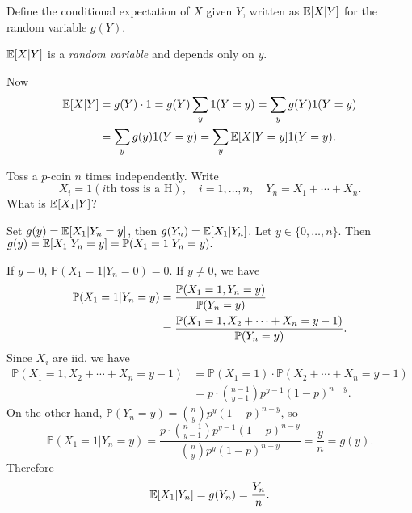 \begin{definition}
    Define the conditional expectation of $X$ given $Y$, written as $ {\mathbb{E}}[X|Y] $ for the random variable $g(Y)$.
\end{definition}
\begin{remark}
    $ {\mathbb{E}}[X|Y] $ is a \textit{random variable} and depends only on $y$.
\end{remark}
Now 
\begin{align*}
    {\mathbb{E}}[X|Y] &= g(Y)\cdot 1 = g(Y) \sum_{y} 1(Y=y) = \sum_{y} g(Y)1(Y=y)\\ 
    &= \sum_{y} g(y)1(Y=y)=\sum_{y} {\mathbb{E}}[X|Y=y]1(Y=y).
\end{align*}
\begin{example}\label{eg:2.11}
    Toss a $p$-coin $n$ times independently. Write 
    \[
        X_i = 1(i\text{th toss is a H}),\quad i=1,\dots,n,\quad Y_n=X_1+\cdots+X_n.
    \]
    What is $ {\mathbb{E}}[X_1|Y] $?

    Set $ g(y)={\mathbb{E}}[X_1|Y_n=y] $, then $g(Y_n)={\mathbb{E}}[X_1|Y_n]$. Let $ y\in \{0,\dots,n\} $. Then $g(y) = {\mathbb{E}}[X_1|Y_n=y] = \mathbb{P}(X_1=1|Y_n=y).$ 

    If $ y=0 $, $\mathbb{P}(X_1=1|Y_n=0)=0$. If $ y\neq 0 $, we have 
    \begin{align*}
        \mathbb{P}(X_1=1|Y_n=y) &= \frac{{\mathbb{P}}(X_1=1,Y_n=y)}{{\mathbb{P}}(Y_n=y)}\\ 
        &= \frac{{\mathbb{P}}(X_1=1,X_2+\cdots+X_n=y-1)}{{\mathbb{P}}(Y_n=y)}.
    \end{align*}
    Since $X_i$ are iid, we have 
    \begin{align*}
        \mathbb{P}(X_1=1,X_2+\cdots+X_n=y-1)&= \mathbb{P}(X_1=1)\cdot \mathbb{P}(X_2+\cdots+X_n=y-1)\\ 
        &= p \cdot \binom{n-1}{y-1}p^{y-1}(1-p)^{n-y}.
    \end{align*}
    On the other hand, $ \mathbb{P}(Y_n=y) = \binom{n}{y}p^{y}(1-p)^{n-y} $, so 
    \[
        \mathbb{P}(X_1=1|Y_n=y) = \frac{p \cdot \binom{n-1}{y-1}p^{y-1}(1-p)^{n-y}}{\binom{n}{y}p^{y}(1-p)^{n-y}} = \frac{y}{n} = g(y).
    \]
    Therefore 
    \[
        {\mathbb{E}}[X_1|Y_n] = g(Y_n) = \frac{Y_n}{n}.
    \]
\end{example}
